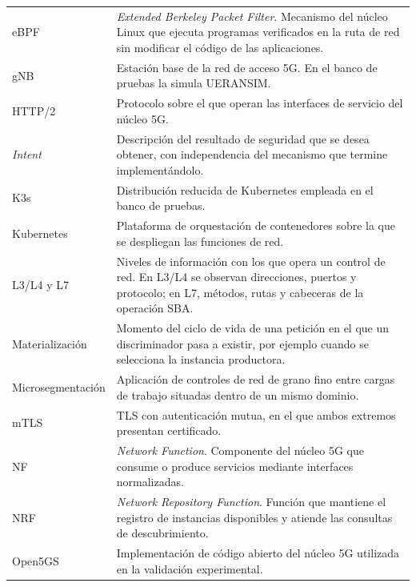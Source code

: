 \begin{singlespace}
\begin{longtable}{@{}>{\raggedright\arraybackslash}p{}>{\raggedright\arraybackslash}p{}@{}}
    eBPF & \textit{Extended Berkeley Packet Filter}. Mecanismo del núcleo Linux que ejecuta programas verificados en la ruta de red sin modificar el código de las aplicaciones. \\

    gNB & Estación base de la red de acceso 5G. En el banco de pruebas la simula UERANSIM. \\

    HTTP/2 & Protocolo sobre el que operan las interfaces de servicio del núcleo 5G. \\

    \textit{Intent} & Descripción del resultado de seguridad que se desea obtener, con independencia del mecanismo que termine implementándolo. \\

    K3s & Distribución reducida de Kubernetes empleada en el banco de pruebas. \\

    Kubernetes & Plataforma de orquestación de contenedores sobre la que se despliegan las funciones de red. \\

    L3/L4 y L7 & Niveles de información con los que opera un control de red. En L3/L4 se observan direcciones, puertos y protocolo; en L7, métodos, rutas y cabeceras de la operación SBA. \\

    Materialización & Momento del ciclo de vida de una petición en el que un discriminador pasa a existir, por ejemplo cuando se selecciona la instancia productora. \\

    Microsegmentación & Aplicación de controles de red de grano fino entre cargas de trabajo situadas dentro de un mismo dominio. \\

    mTLS & TLS con autenticación mutua, en el que ambos extremos presentan certificado. \\

    NF & \textit{Network Function}. Componente del núcleo 5G que consume o produce servicios mediante interfaces normalizadas. \\

    NRF & \textit{Network Repository Function}. Función que mantiene el registro de instancias disponibles y atiende las consultas de descubrimiento. \\

    Open5GS & Implementación de código abierto del núcleo 5G utilizada en la validación experimental. \\


\end{longtable}
\end{singlespace}
